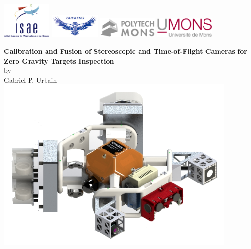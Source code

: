 \documentclass[12pt,twoside]{article}
\begin{document}
\begin{titlepage}
\includegraphics[width=2.5cm]{img/isae.png}
\hspace{60pt}
\includegraphics[width=2.5cm]{img/supaero.jpg}
\hspace{90pt}
\includegraphics[width=3cm]{img/fpms.jpg}
\hspace{50pt}
\includegraphics[width=3cm]{img/umons.eps}
\begin{center}
\vspace{40pt}
{\Large \bf Calibration and Fusion of Stereoscopic and Time-of-Flight Cameras for Zero Gravity Targets Inspection}\\
\vspace{10pt}
by\\
\vspace{10pt}
{\Large Gabriel P. Urbain}\\
\vspace{20pt}
\includegraphics[width=12cm]{img/inspect.png}\\

\end{center}
\end{titlepage}
\end{document}
